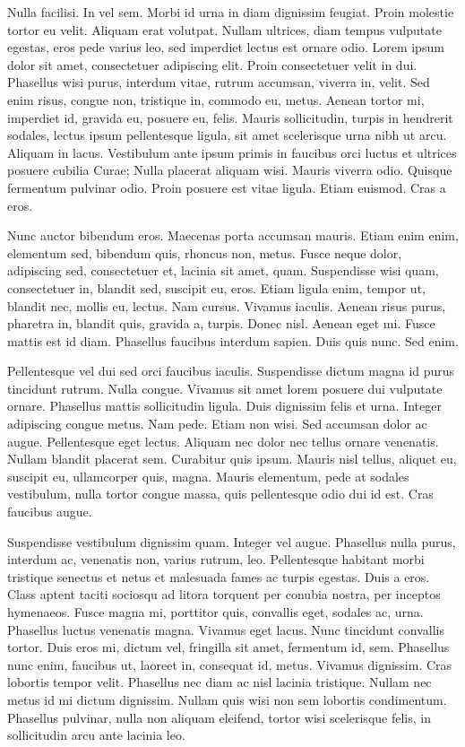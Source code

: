 Nulla facilisi. In vel sem. Morbi id urna in diam dignissim feugiat. Proin
molestie tortor eu velit. Aliquam erat volutpat. Nullam ultrices, diam tempus
vulputate egestas, eros pede varius leo, sed imperdiet lectus est ornare odio.
Lorem ipsum dolor sit amet, consectetuer adipiscing elit. Proin consectetuer
velit in dui. Phasellus wisi purus, interdum vitae, rutrum accumsan, viverra
in, velit. Sed enim risus, congue non, tristique in, commodo eu, metus. Aenean
tortor mi, imperdiet id, gravida eu, posuere eu, felis. Mauris sollicitudin,
turpis in hendrerit sodales, lectus ipsum pellentesque ligula, sit amet
scelerisque urna nibh ut arcu. Aliquam in lacus. Vestibulum ante ipsum primis
in faucibus orci luctus et ultrices posuere cubilia Curae; Nulla placerat
aliquam wisi. Mauris viverra odio. Quisque fermentum pulvinar odio. Proin
posuere est vitae ligula. Etiam euismod. Cras a eros.

Nunc auctor bibendum eros. Maecenas porta accumsan mauris. Etiam enim enim,
elementum sed, bibendum quis, rhoncus non, metus. Fusce neque dolor, adipiscing
sed, consectetuer et, lacinia sit amet, quam. Suspendisse wisi quam,
consectetuer in, blandit sed, suscipit eu, eros. Etiam ligula enim, tempor ut,
blandit nec, mollis eu, lectus. Nam cursus. Vivamus iaculis. Aenean risus
purus, pharetra in, blandit quis, gravida a, turpis. Donec nisl. Aenean eget
mi. Fusce mattis est id diam. Phasellus faucibus interdum sapien. Duis quis
nunc. Sed enim.

Pellentesque vel dui sed orci faucibus iaculis. Suspendisse dictum magna id
purus tincidunt rutrum. Nulla congue. Vivamus sit amet lorem posuere dui
vulputate ornare. Phasellus mattis sollicitudin ligula. Duis dignissim felis et
urna. Integer adipiscing congue metus. Nam pede. Etiam non wisi. Sed accumsan
dolor ac augue. Pellentesque eget lectus. Aliquam nec dolor nec tellus ornare
venenatis. Nullam blandit placerat sem. Curabitur quis ipsum. Mauris nisl
tellus, aliquet eu, suscipit eu, ullamcorper quis, magna. Mauris elementum,
pede at sodales vestibulum, nulla tortor congue massa, quis pellentesque odio
dui id est. Cras faucibus augue.

Suspendisse vestibulum dignissim quam. Integer vel augue. Phasellus nulla
purus, interdum ac, venenatis non, varius rutrum, leo. Pellentesque habitant
morbi tristique senectus et netus et malesuada fames ac turpis egestas. Duis a
eros. Class aptent taciti sociosqu ad litora torquent per conubia nostra, per
inceptos hymenaeos. Fusce magna mi, porttitor quis, convallis eget, sodales ac,
urna. Phasellus luctus venenatis magna. Vivamus eget lacus. Nunc tincidunt
convallis tortor. Duis eros mi, dictum vel, fringilla sit amet, fermentum id,
sem. Phasellus nunc enim, faucibus ut, laoreet in, consequat id, metus. Vivamus
dignissim. Cras lobortis tempor velit. Phasellus nec diam ac nisl lacinia
tristique. Nullam nec metus id mi dictum dignissim. Nullam quis wisi non sem
lobortis condimentum. Phasellus pulvinar, nulla non aliquam eleifend, tortor
wisi scelerisque felis, in sollicitudin arcu ante lacinia leo.

